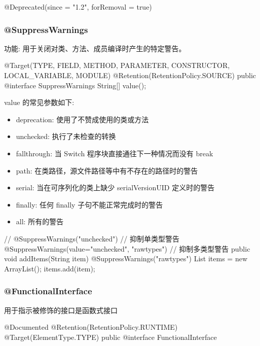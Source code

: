 \begin{Java}
@Deprecated(since = "1.2", forRemoval = true)
\end{Java}

\subsubsection{@SuppressWarnings}

功能: 用于关闭对类、方法、成员编译时产生的特定警告。

\begin{Java}
@Target({TYPE, FIELD, METHOD, PARAMETER, CONSTRUCTOR, LOCAL_VARIABLE, MODULE})
@Retention(RetentionPolicy.SOURCE)
public @interface SuppressWarnings {
    String[] value();
}
\end{Java}

value 的常见参数如下:
\begin{itemize}
    \item deprecation: 使用了不赞成使用的类或方法
    \item unchecked: 执行了未检查的转换
    \item fallthrough: 当 Switch 程序块直接通往下一种情况而没有 break
    \item path: 在类路径，源文件路径等中有不存在的路径时的警告
    \item serial: 当在可序列化的类上缺少 serialVersionUID 定义时的警告
    \item finally: 任何 finally 子句不能正常完成时的警告
    \item all: 所有的警告
\end{itemize}

\begin{Java}
// @SuppressWarnings("unchecked")                   // 抑制单类型警告
@SuppressWarnings(value={"unchecked", "rawtypes"})  // 抑制多类型警告
public void addItems(String item){  
  @SuppressWarnings("rawtypes")  
   List items = new ArrayList();  
   items.add(item);  
}
\end{Java}

\subsubsection{@FunctionalInterface}

用于指示被修饰的接口是函数式接口
\begin{Java}
@Documented
@Retention(RetentionPolicy.RUNTIME)
@Target(ElementType.TYPE)
public @interface FunctionalInterface {}
\end{Java}

